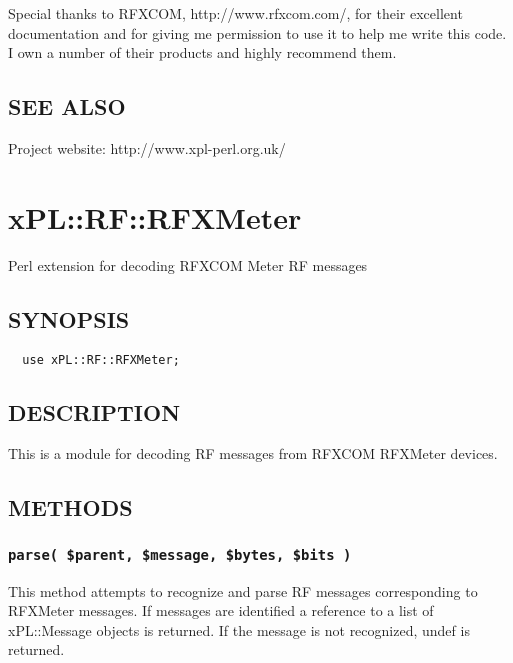 Special thanks to RFXCOM, \textsf{http://www.rfxcom.com/}, for their
excellent documentation and for giving me permission to use it to help
me write this code.  I own a number of their products and highly
recommend them.

\subsection*{SEE ALSO\label{xPL::RF_SEE_ALSO}}


Project website: http://www.xpl-perl.org.uk/

\section{xPL::RF::RFXMeter\label{xPL::RF::RFXMeter}}


Perl extension for decoding RFXCOM Meter RF messages

\subsection*{SYNOPSIS\label{xPL::RF::RFXMeter_SYNOPSIS}}
\begin{verbatim}
  use xPL::RF::RFXMeter;
\end{verbatim}
\subsection*{DESCRIPTION\label{xPL::RF::RFXMeter_DESCRIPTION}}


This is a module for decoding RF messages from RFXCOM RFXMeter devices.

\subsection*{METHODS\label{xPL::RF::RFXMeter_METHODS}}
\subsubsection*{\texttt{parse( \$parent, \$message, \$bytes, \$bits )}\label{xPL::RF::RFXMeter_parse_parent_message_bytes_bits_}}


This method attempts to recognize and parse RF messages corresponding
to RFXMeter messages.  If messages are identified a reference to a
list of xPL::Message objects is returned.  If the message is not
recognized, undef is returned.


